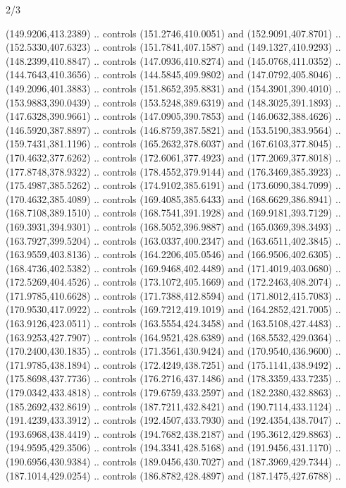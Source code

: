 \begin{flagdescription}{2/3}
\begin{scope}[shift={(0.5\flaglength,0.5)},scale=\flagwidth/545]
\begin{scope}[y=0.80pt, x=0.80pt, yscale=-1,shift={(-297,-430)}]
\begin{scope}[shift={(28.51887,-25.61095)}]
  (149.9206,413.2389) .. controls (151.2746,410.0051) and (152.9091,407.8701) ..
  (152.5330,407.6323) .. controls (151.7841,407.1587) and (149.1327,410.9293) ..
  (148.2399,410.8847) .. controls (147.0936,410.8274) and (145.0768,411.0352) ..
  (144.7643,410.3656) .. controls (144.5845,409.9802) and (147.0792,405.8046) ..
  (149.2096,401.3883) .. controls (151.8652,395.8831) and (154.3901,390.4010) ..
  (153.9883,390.0439) .. controls (153.5248,389.6319) and (148.3025,391.1893) ..
  (147.6328,390.9661) .. controls (147.0905,390.7853) and (146.0632,388.4626) ..
  (146.5920,387.8897) .. controls (146.8759,387.5821) and (153.5190,383.9564) ..
  (159.7431,381.1196) .. controls (165.2632,378.6037) and (167.6103,377.8045) ..
  (170.4632,377.6262) .. controls (172.6061,377.4923) and (177.2069,377.8018) ..
  (177.8748,378.9322) .. controls (178.4552,379.9144) and (176.3469,385.3923) ..
  (175.4987,385.5262) .. controls (174.9102,385.6191) and (173.6090,384.7099) ..
  (170.4632,385.4089) .. controls (169.4085,385.6433) and (168.6629,386.8941) ..
  (168.7108,389.1510) .. controls (168.7541,391.1928) and (169.9181,393.7129) ..
  (169.3931,394.9301) .. controls (168.5052,396.9887) and (165.0369,398.3493) ..
  (163.7927,399.5204) .. controls (163.0337,400.2347) and (163.6511,402.3845) ..
  (163.9559,403.8136) .. controls (164.2206,405.0546) and (166.9506,402.6305) ..
  (168.4736,402.5382) .. controls (169.9468,402.4489) and (171.4019,403.0680) ..
  (172.5269,404.4526) .. controls (173.1072,405.1669) and (172.2463,408.2074) ..
  (171.9785,410.6628) .. controls (171.7388,412.8594) and (171.8012,415.7083) ..
  (170.9530,417.0922) .. controls (169.7212,419.1019) and (164.2852,421.7005) ..
  (163.9126,423.0511) .. controls (163.5554,424.3458) and (163.5108,427.4483) ..
  (163.9253,427.7907) .. controls (164.9521,428.6389) and (168.5532,429.0364) ..
  (170.2400,430.1835) .. controls (171.3561,430.9424) and (170.9540,436.9600) ..
  (171.9785,438.1894) .. controls (172.4249,438.7251) and (175.1141,438.9492) ..
  (175.8698,437.7736) .. controls (176.2716,437.1486) and (178.3359,433.7235) ..
  (179.0342,433.4818) .. controls (179.6759,433.2597) and (182.2380,432.8863) ..
  (185.2692,432.8619) .. controls (187.7211,432.8421) and (190.7114,433.1124) ..
  (191.4239,433.3912) .. controls (192.4507,433.7930) and (192.4354,438.7047) ..
  (193.6968,438.4419) .. controls (194.7682,438.2187) and (195.3612,429.8863) ..
  (194.9595,429.3506) .. controls (194.3341,428.5168) and (191.9456,431.1170) ..
  (190.6956,430.9384) .. controls (189.0456,430.7027) and (187.3969,429.7344) ..
  (187.1014,429.0254) .. controls (186.8782,428.4897) and (187.1475,427.6788) ..

\end{scope}
\end{scope}
\end{scope}
\end{flagdescription}
